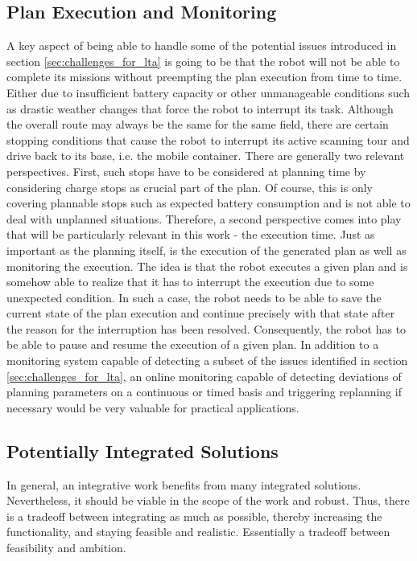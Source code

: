 \documentclass[english, master, expose, utf8]{base/thesis_KBS}
\begin{document}
\subsection{Plan Execution and Monitoring}

A key aspect of being able to handle some of the potential issues introduced in section \ref{sec:challenges_for_lta} is going to be that the robot will not be able to
complete its missions without preempting the plan execution from time to time. Either due to insufficient battery capacity or other unmanageable conditions such as 
drastic weather changes that force the robot to interrupt its task. Although the overall route may always be the same for the same field, there are certain stopping
conditions that cause the robot to interrupt its active scanning tour and drive back to its base, i.e. the mobile container.
There are generally two relevant perspectives. First, such stops have to be considered at planning time by considering charge stops as crucial part of the plan.
Of course, this is only covering plannable stops such as expected battery consumption and is not able to deal with unplanned situations.
Therefore, a second perspective comes into play that will be particularly relevant in this work - the execution time.
Just as important as the planning itself, is the execution of the generated plan as well as monitoring the execution.
The idea is that the robot executes a given plan and is somehow able to realize that it has to interrupt the execution due to some unexpected condition.
In such a case, the robot needs to be able to save the current state of the plan execution and continue precisely with that state after the reason 
for the interruption has been resolved. Consequently, the robot has to be able to pause and resume the execution of a given plan.\newline
In addition to a monitoring system capable of detecting a subset of the issues identified in section \ref{sec:challenges_for_lta},
an online monitoring capable of detecting deviations of planning parameters on a continuous or timed basis and triggering replanning if necessary would
be very valuable for practical applications.

\subsection{Potentially Integrated Solutions}

In general, an integrative work benefits from many integrated solutions. Nevertheless, it should be viable in the scope of the work and robust.
Thus, there is a tradeoff between integrating as much as possible, thereby increasing the functionality, and staying feasible and realistic.
Essentially a tradeoff between feasibility and ambition.
\end{document}
